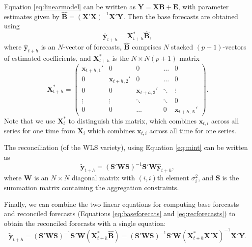 \documentclass[11pt,a4paper,]{article}
\begin{document}
Equation \eqref{eq:linearmodel} can be written as
\(\bm{Y} = \bm{X} \bm{B} + \bm{E}\), with parameter estimates given by
\(\hat{\bm{B}} = (\bm{X}'\bm{X})^{-1} \bm{X}'\bm{Y}\). Then the base
forecasts are obtained using \begin{equation}\label{eq:baseforecats}
\hat{\bm{y}}_{t+h} = \bm{X}_{t+h}^* \hat{\bm{B}},
\end{equation} where \(\hat{\bm{y}}_{t+h}\) is an \(N\)-vector of
forecasts, \(\hat{\bm{B}}\) comprises \(N\) stacked \((p+1)\)-vectors of
estimated coefficients, and \(\bm{X}_{t+h}^*\) is the \(N\times N(p+1)\)
matrix \pagebreak[3]\begin{equation}
\bm{X}_{t+h}^* =
\begin{pmatrix}
\bm{x}_{t+h,1}' & 0                & 0                & \dots  & 0\\
0               & \bm{x}_{t+h,2}' & 0                & \dots  & 0\\
0               & 0                & \bm{x}_{t+h,3}' & \ddots & \vdots \\
\vdots          & \vdots           & \ddots           & \ddots & 0\\
0               & 0                & \dots            & 0      & \bm{x}_{t+h,N}'
\end{pmatrix}.
\end{equation} Note that we use \(\bm{X}^*_{t}\) to distinguish this
matrix, which combines \(\bm{x}_{t,i}\) across all series for one time
from \(\bm{X}_i\) which combines \(\bm{x}_{t,i}\) across all time for
one series.

The reconciliation (of the WLS variety), using Equation \eqref{eq:mint}
can be written as \begin{equation}\label{eq:recforecasts}
\tilde{\bm{y}}_{t+h} = (\bm{S}'\bm{W}\bm{S})^{-1}\bm{S}'\bm{W}\hat{\bm{y}}_{t+h},
\end{equation} where \(\bm{W}\) is an \(N\times N\) diagonal matrix with
\((i,i)\)th element \(\sigma_i^2\), and \(\bm{S}\) is the summation
matrix containing the aggregation constraints.

Finally, we can combine the two linear equations for computing base
forecasts and reconciled forecasts (Equations \eqref{eq:baseforecats} and
\eqref{eq:recforecasts}) to obtain the reconciled forecasts with a single
equation: \begin{equation}\label{eq:singlestep}
\tilde{\bm{y}}_{t+h} = (\bm{S}'\bm{W}\bm{S})^{-1}\bm{S}'\bm{W}
                        (\bm{X}_{t+h}^* \hat{\bm{B}})
                        = (\bm{S}'\bm{W}\bm{S})^{-1}\bm{S}'\bm{W}
                        (\bm{X}_{t+h}^* \bm{X}'\bm{X})^{-1} \bm{X}'\bm{Y}.
\end{equation}
\end{document}
